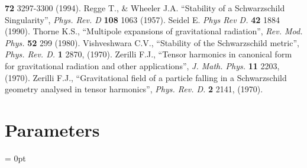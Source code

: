 \begin{thebibliography}{9}
                        {\bf 72} 
                        3297-3300 
                        (1994).
         Regge T., \& Wheeler J.A. 
                        ``Stability of a Schwarzschild Singularity'', 
                        {\em Phys. Rev. D} 
                        {\bf 108} 
                        1063 
                        (1957).
      Seidel E. 
                        {\em Phys Rev D.} 
                        {\bf 42} 
                        1884 
                        (1990).
      Thorne K.S., 
                        ``Multipole expansions of gravitational radiation'', 
                        {\em Rev. Mod. Phys.} 
                        {\bf 52} 
                        299 
                        (1980).
          Vishveshwara C.V., 
                        ``Stability of the Schwarzschild metric'',
                        {\em Phys. Rev. D.} 
                        {\bf 1} 
                        2870, 
                        (1970).
    Zerilli F.J., 
                        ``Tensor harmonics in canonical form for gravitational 
                          radiation and other applications'', 
                        {\em J. Math. Phys.} 
                        {\bf 11} 
                        2203, 
                        (1970).
     Zerilli F.J., 
                        ``Gravitational field of a particle falling 
                          in a Schwarzschild geometry analysed in 
                          tensor harmonics'',
                        {\em Phys. Rev. D.} 
                        {\bf 2} 
                        2141, 
                        (1970).
\end{thebibliography}




\section{Parameters} 


\parskip = 0pt

\setlength{\tableWidth}{160mm}

\setlength{\paraWidth}{\tableWidth}
\setlength{\descWidth}{\tableWidth}
\settowidth{\maxVarWidth}{interpolation\_operator}

\addtolength{\paraWidth}{-\maxVarWidth}
\addtolength{\paraWidth}{-\columnsep}
\addtolength{\paraWidth}{-\columnsep}
\addtolength{\paraWidth}{-\columnsep}

